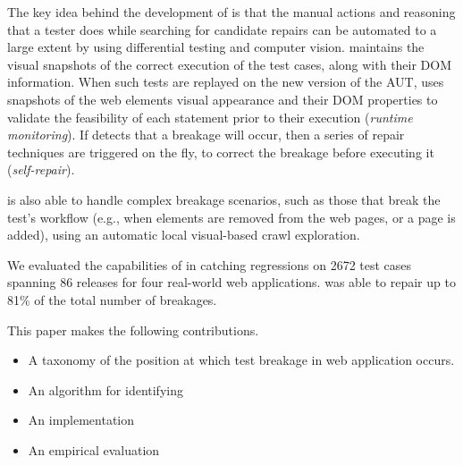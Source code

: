 

The key idea behind the development of \tool is that the manual actions and reasoning that a tester does while searching for candidate repairs can be automated to a large extent by using differential testing and computer vision. 
\tool maintains the visual snapshots of the correct execution of the test cases, along with their DOM information. When such tests are replayed on the new version of the AUT, \tool uses snapshots of the web elements visual appearance and their DOM properties to validate the feasibility of each statement prior to their execution (\textit{runtime monitoring}). If \tool detects that a breakage will occur, then a series of repair techniques are triggered on the fly, to correct the breakage before executing it (\textit{self-repair}).

\tool is also able to handle complex breakage scenarios, such as those that break the test's workflow (e.g., when elements are removed from the web pages, or a page is added), using an automatic local visual-based crawl exploration.

We evaluated the capabilities of \tool in catching regressions on 2672 test cases spanning 86 releases for four real-world web applications. \tool was able to repair up to 81\% of the total number of breakages. 

This paper makes the following contributions.
\begin{itemize}
\item A taxonomy of the position at which test breakage in web application occurs.
\item An algorithm for identifying 
\item An implementation 
\item An empirical evaluation 
\end{itemize}








